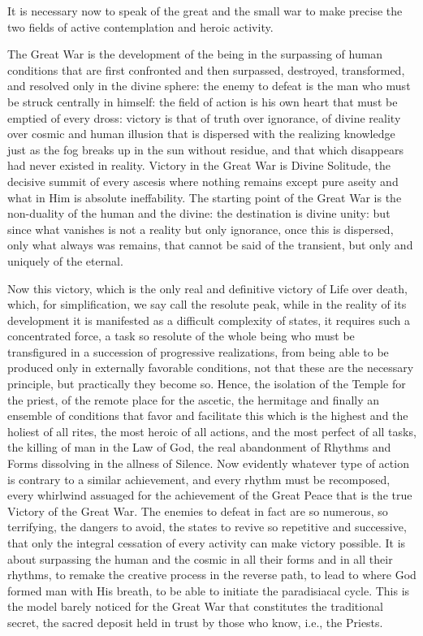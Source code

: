 It is necessary now to speak of the great and the small war to make precise the two fields of active contemplation and heroic activity.

The Great War is the development of the being in the surpassing of human conditions that are first confronted and then surpassed, destroyed, transformed, and resolved only in the divine sphere: the enemy to defeat is the man who must be struck centrally in himself: the field of action is his own heart that must be emptied of every dross: victory is that of truth over ignorance, of divine reality over cosmic and human illusion that is dispersed with the realizing knowledge just as the fog breaks up in the sun without residue, and that which disappears had never existed in reality. Victory in the Great War is Divine Solitude, the decisive summit of every ascesis where nothing remains except pure aseity and what in Him is absolute ineffability. The starting point of the Great War is the non-duality of the human and the divine: the destination is divine unity: but since what vanishes is not a reality but only ignorance, once this is dispersed, only what always was remains, that cannot be said of the transient, but only and uniquely of the eternal.

Now this victory, which is the only real and definitive victory of Life over death, which, for simplification, we say call the resolute peak, while in the reality of its development it is manifested as a difficult complexity of states, it requires such a concentrated force, a task so resolute of the whole being who must be transfigured in a succession of progressive realizations, from being able to be produced only in externally favorable conditions, not that these are the necessary principle, but practically they become so. Hence, the isolation of the Temple for the priest, of the remote place for the ascetic, the hermitage and finally an ensemble of conditions that favor and facilitate this which is the highest and the holiest of all rites, the most heroic of all actions, and the most perfect of all tasks, the killing of man in the Law of God, the real abandonment of Rhythms and Forms dissolving in the allness of Silence. Now evidently whatever type of action is contrary to a similar achievement, and every rhythm must be recomposed, every whirlwind assuaged for the achievement of the Great Peace that is the true Victory of the Great War. The enemies to defeat in fact are so numerous, so terrifying, the dangers to avoid, the states to revive so repetitive and successive, that only the integral cessation of every activity can make victory possible. It is about surpassing the human and the cosmic in all their forms and in all their rhythms, to remake the creative process in the reverse path, to lead to where God formed man with His breath, to be able to initiate the paradisiacal cycle. This is the model barely noticed for the Great War that constitutes the traditional secret, the sacred deposit held in trust by those who know, i.e., the Priests.

